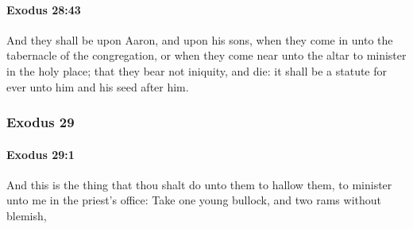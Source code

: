 		\paragraph{Exodus 28:43} %
			\label{EXODUS-28-43}

			And they shall be upon Aaron, and upon his sons, when they come in unto the tabernacle of the congregation, or when they come near unto the altar to minister in the holy place; that they bear not iniquity, and die: it shall be a statute for ever unto him and his seed after him.

	\subsubsection{Exodus 29} %
		\label{EXODUS-29}

		\paragraph{Exodus 29:1} %
			\label{EXODUS-29-1}

			And this is the thing that thou shalt do unto them to hallow them, to minister unto me in the priest's office: Take one young bullock, and two rams without blemish,

